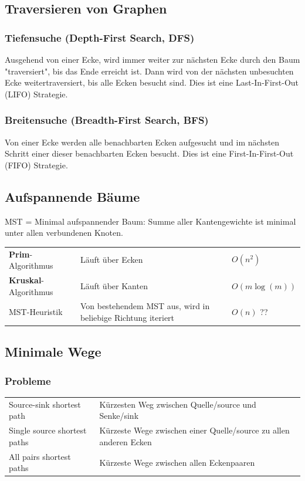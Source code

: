 \subsection{Traversieren von Graphen }
	\subsubsection{Tiefensuche (Depth-First Search, DFS)}
		Ausgehend von einer Ecke, wird immer weiter zur nächsten Ecke durch den Baum "traversiert", bis das Ende erreicht ist. Dann wird von der nächsten unbesuchten Ecke weitertraversiert, bis alle Ecken besucht sind. Dies ist eine Last-In-First-Out (LIFO) Strategie.
	
	\subsubsection{Breitensuche (Breadth-First Search, BFS)}
  	Von einer Ecke werden alle benachbarten Ecken aufgesucht und im nächsten Schritt einer dieser benachbarten Ecken besucht. Dies ist eine First-In-First-Out (FIFO) Strategie.
	
\subsection{Aufspannende Bäume }
	MST = Minimal aufspannender Baum: Summe aller Kantengewichte ist minimal unter allen verbundenen Knoten.
	
	\begin{tabularx}{\textwidth}{p{4cm} X p{4cm}}
	  \textbf{Prim}-Algorithmus
	    & Läuft über Ecken
	    & $O(n^2)$ \\
	  \textbf{Kruskal}-Algorithmus
	    & Läuft über Kanten
	    & $O(m \log(m))$\\
	  MST-Heuristik
	    & Von bestehendem MST aus, wird in beliebige Richtung iteriert
	    & $O(n)$ ??
	\end{tabularx}

\subsection{Minimale Wege }
  \subsubsection{Probleme}
    \begin{tabular}{ll}
      Source-sink shortest path
        & Kürzesten Weg zwischen Quelle/source und Senke/sink \\
      Single source shortest paths
        & Kürzeste Wege zwischen einer Quelle/source zu allen anderen Ecken \\
      All pairs shortest paths
        & Kürzeste Wege zwischen allen Eckenpaaren\\
    \end{tabular}

